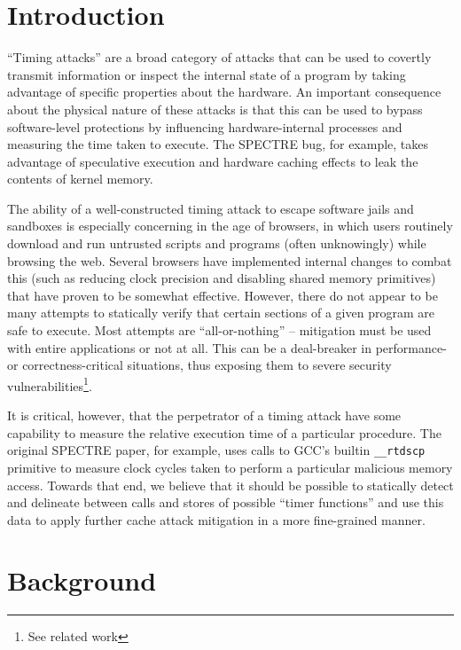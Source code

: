 \documentclass[12pt]{article}
\begin{document}
\begin{multicols*}{2}
  \section{Introduction}
  ``Timing attacks'' are a broad category of attacks that can be used to
  covertly transmit information or inspect the internal state of a program by
  taking advantage of specific properties about the hardware. An important
  consequence about the physical nature of these attacks is that this can be
  used to bypass software-level protections by influencing hardware-internal
  processes and measuring the time taken to execute. The SPECTRE bug, for
  example, takes advantage of speculative execution and hardware caching
  effects to leak the contents of kernel memory.

  The ability of a well-constructed timing attack to escape software jails and
  sandboxes is especially concerning in the age of browsers, in which users
  routinely download and run untrusted scripts and programs (often unknowingly)
  while browsing the web. Several browsers have implemented internal changes to
  combat this (such as reducing clock precision and disabling shared memory
  primitives) that have proven to be somewhat effective. However, there do not
  appear to be many attempts to statically verify that certain sections of a
  given program are safe to execute. Most attempts are ``all-or-nothing'' --
  mitigation must be used with entire applications or not at all. This can be
  a deal-breaker in performance- or correctness-critical situations, thus
  exposing them to severe security vulnerabilities\footnote{See related work}.

  It is critical, however, that the perpetrator of a timing attack have some
  capability to measure the relative execution time of a particular procedure.
  The original SPECTRE paper, for example, uses calls to GCC's builtin
  \texttt{\_\_rtdscp} primitive to measure clock cycles taken to perform a
  particular malicious memory access\cite{spectrep}. Towards that end, we
  believe that it should be possible to statically detect and delineate between
  calls and stores of possible ``timer functions'' and use this data to apply
  further cache attack mitigation in a more fine-grained manner.

  \section{Background}


\end{multicols*}
\end{document}
